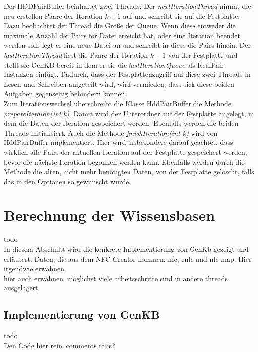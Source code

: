\documentclass[12pt,a4paper]{article}
\begin{document}
Der HDDPairBuffer beinhaltet zwei Threads: Der \textit{nextIterationThread} nimmt die neu erstellen Paare der Iteration $k+1$ auf und schreibt sie auf die Festplatte. Dazu beobachtet der Thread die Größe der Queue. Wenn diese entweder die maximale Anzahl der Pairs for Datei erreicht hat, oder eine Iteration beendet werden soll, legt er eine neue Datei an und schreibt in diese die Pairs hinein. Der \textit{lastIterationThread} liest die Paare der Iteration $k-1$ von der Festplatte und stellt sie GenKB bereit in dem er sie die \textit{lastIterationQueue} als RealPair Instanzen einfügt. Dadurch, dass der Festplattenzugriff auf diese zwei Threads in Lesen und Schreiben aufgeteilt wird, wird vermieden, dass sich diese beiden Aufgaben gegenseitig behindern können. \\
Zum Iterationswechsel überschreibt die Klasse HddPairBuffer die Methode \textit{prepareIteraion(int k)}. Damit wird der Unterordner auf der Festplatte angelegt, in dem die Daten der Iteration gespeichert werden. Ebenfalls werden die beiden Threads initialisiert. Auch die Methode \textit{finishIteration(int k)} wird von HddPairBuffer implementiert. Hier wird insbesondere darauf geachtet, dass wirklich alle Pairs der aktuellen Iteration auf der Festplatte gespeichert werden, bevor die nächste Iteration begonnen werden kann. Ebenfalls werden durch die Methode die alten, nicht mehr benötigten Daten, von der Festplatte gelöscht, falls das in den Optionen so gewünscht wurde.




\section{Berechnung der Wissensbasen}
todo \\
In diesem Abschnitt wird die konkrete Implementierung von GenKb gezeigt und erläutert.
Daten, die aus dem NFC Creator kommen: nfc, cnfc und nfc map. Hier irgendwie erwähnen. \\
hier auch erwähnen: möglichst viele arbeitsschritte sind in andere threads ausgelagert. \\





\subsection{Implementierung von GenKB}
todo \\
Den Code hier rein. comments raus?
\end{document}
